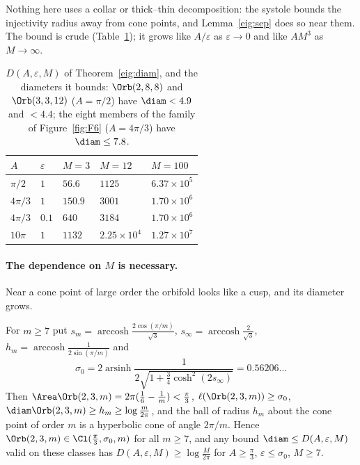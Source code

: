 Nothing here uses a collar or thick--thin decomposition: the systole bounds the injectivity radius away from cone points, and Lemma~\ref{eig:sep} does so near them. The bound is crude (Table~\ref{eig:tab:D}); it grows like $A/\varepsilon$ as $\varepsilon\to0$ and like $AM^3$ as $M\to\infty$.

\begin{table}[h]
\centering\footnotesize
\caption{$D(A,\varepsilon,M)$ of Theorem~\ref{eig:diam}, and the diameters it bounds: $\Orb(2,8,8)$ and $\Orb(3,3,12)$ ($A=\pi/2$) have $\diam<4.9$ and $<4.4$; the eight members of the family of Figure~\ref{fig:F6} ($A=4\pi/3$) have $\diam\le7.8$.}\label{eig:tab:D}
\begin{tabular}{@{}lllll@{}}
\toprule
$A$ & $\varepsilon$ & $M=3$ & $M=12$ & $M=100$\\
\midrule
$\pi/2$ & $1$ & $56.6$ & $1125$ & $6.37\times10^5$\\
$4\pi/3$ & $1$ & $150.9$ & $3001$ & $1.70\times10^6$\\
$4\pi/3$ & $0.1$ & $640$ & $3184$ & $1.70\times10^6$\\
$10\pi$ & $1$ & $1132$ & $2.25\times10^4$ & $1.27\times10^7$\\
\bottomrule
\end{tabular}
\end{table}

\paragraph{The dependence on $M$ is necessary.} Near a cone point of large order the orbifold looks like a cusp, and its diameter grows.

\begin{proposition}\label{eig:233}
For $m\ge7$ put $s_m=\operatorname{arccosh}\frac{2\cos(\pi/m)}{\sqrt3}$, $s_\infty=\operatorname{arccosh}\frac2{\sqrt3}$, $h_m=\operatorname{arccosh}\frac1{2\sin(\pi/m)}$ and
\[
  \sigma_0=2\operatorname{arsinh}\frac1{2\sqrt{1+\frac34\cosh^2(2s_\infty)}}=0.56206\ldots
\]
Then $\Area\Orb(2,3,m)=2\pi(\frac16-\frac1m)<\frac\pi3$, $\ell(\Orb(2,3,m))\ge\sigma_0$, $\diam\Orb(2,3,m)\ge h_m\ge\log\frac m{2\pi}$, and the ball of radius $h_m$ about the cone point of order $m$ is a hyperbolic cone of angle $2\pi/m$. Hence $\Orb(2,3,m)\in\Cl(\frac\pi3,\sigma_0,m)$ for all $m\ge7$, and any bound $\diam\le D(A,\varepsilon,M)$ valid on these classes has $D(A,\varepsilon,M)\ge\log\frac M{2\pi}$ for $A\ge\frac\pi3$, $\varepsilon\le\sigma_0$, $M\ge7$.
\end{proposition}

